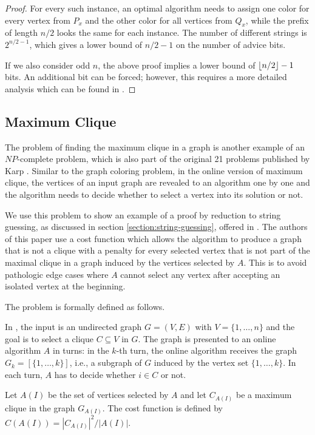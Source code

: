 \begin{proof}
    For every such instance, an optimal algorithm needs to assign one
    color for every vertex from $P_x$ and the other color for all vertices
    from $Q_x$, while the prefix of length $n/2$ looks the same for each
    instance. The number of different strings is $2^{n/2-1}$, which gives
    a lower bound of $n/2-1$ on the number of advice bits.

    If we also consider odd $n$, the above proof implies a lower bound of
    $\lfloor n/2\rfloor-1$ bits. An additional bit can be forced; however, this
    requires a more detailed analysis which can be found in
    \cite{misof-trivial-graphs}.
\end{proof}

\subsection{Maximum Clique}

The problem of finding the maximum clique in a graph is another example of
an $NP$-complete problem, which is also part of the original 21 problems
published by Karp \cite{karp-np}. Similar to the graph coloring problem,
in the online version of maximum clique, the vertices of an input graph
are revealed to an algorithm one by one and the algorithm needs to decide
whether to select a vertex into its solution or not.

We use this problem to show an example of a proof by reduction to string
guessing, as discussed in section \ref{section:string-guessing}, offered in
\cite{string-guessing}. The authors of this paper use a cost function
which allows the algorithm to produce a graph that is not a clique with a
penalty for every selected vertex that is not part of the maximal clique
in a graph induced by the vertices selected by $A$. This is to avoid
pathologic edge cases where $A$ cannot select any vertex after accepting
an isolated vertex at the beginning.

The problem is formally defined as follows.

\begin{definition}\label{definition:max-clique}
    In , the input is an undirected graph $G = (V, E)$
    with $V = \{1, \dots, n\}$ and the goal is to select a clique $C
    \subseteq V$ in $G$. The graph is presented to an online algorithm $A$
    in turns: in the $k$-th turn, the online algorithm receives the graph
    $G_k = [\{1, \dots, k\}]$, i.e., a subgraph of $G$ induced by the
    vertex set $\{1, \dots, k\}$. In each turn, $A$ has to decide whether
    $i \in C$ or not.

    Let $A(I)$ be the set of vertices selected by $A$ and let $C_{A(I)}$
    be a maximum clique in the graph $G_{A(I)}$. The cost function is
    defined by $C(A(I)) = |C_{A(I)}|^2 / |A(I)|$.
\end{definition}

